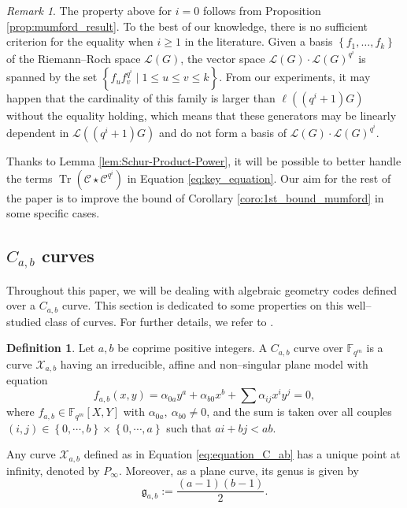 \documentclass[a4paper]{amsart}
\theoremstyle{definition}
\newtheorem{definition}[thm]{Definition}
\theoremstyle{remark}
\newtheorem{remark}[thm]{Remark}
\DeclareMathOperator{\trace}{Tr}
\newcommand{\calL}{\mathcal{L}}
\newcommand{\calC}{\mathcal{C}}
\newcommand{\calX}{\mathcal{X}}
\newcommand{\fqm}{\mathbb{F}_{q^m}}
\newcommand{\Tr}[1]{\trace\!\left(#1\right)}
\newcommand{\set}[1]{\left\{#1\right\}}
\begin{document}
\begin{remark}
The property above for $i=0$ follows from Proposition \ref{prop:mumford_result}. To the best of our knowledge, there is no sufficient criterion for the equality when $i \geq 1$ in the literature. Given a basis $\set{f_1,\dots,f_k}$ of the Riemann--Roch space $\calL(G)$, the vector space $\calL(G)\cdot \calL(G)^{q^i}$ is spanned by the set $\set{f_u f_v^{q^i} \mid 1 \leq u \leq v \leq k}$. From our experiments, it may happen that the cardinality of this family is larger than $\ell((q^i+1)G)$ without the equality holding, which means that these generators may be linearly dependent in $\calL((q^i+1)G)$ and do not form a basis of $\calL(G)\cdot \calL(G)^{q^i}$.
\end{remark}

Thanks to Lemma \ref{lem:Schur-Product-Power}, it will be possible to better handle the terms $\Tr{\calC\star \calC^{q^i}}$ in Equation \eqref{eq:key_equation}. Our aim for the rest of the paper is to improve the bound of Corollary \ref {coro:1st_bound_mumford} in some specific cases.

\subsection{$C_{a,b}$ curves} \label{section:C_a,b_codes}
Throughout this paper, we will be dealing with algebraic geometry codes defined over a $C_{a,b}$ curve. This section is dedicated to some properties on this well--studied class of curves. For further details, we refer to \cite{Miu93}. 

\begin{definition} \label{def:C_ab_curves} 
Let $a,b$ be coprime positive integers. A $C_{a,b}$ curve over $\fqm$ is a curve $\calX_{a,b}$ having an irreducible, affine and non--singular plane model with equation
\begin{equation} \label{eq:equation_C_ab}
f_{a,b}(x,y) = \alpha_{0a}y^a + \alpha_{b0}x^b + \sum \alpha_{ij}x^iy^j = 0,
\end{equation}
where $f_{a,b} \in \fqm[X,Y]$ with $\alpha_{0a}, \: \alpha_{b0} \neq 0$, and the sum is taken over all couples $(i,j) \in \set{0,\cdots,b} \times \set{0,\cdots,a}$ such that $ai+bj < ab$.
\end{definition}
Any curve $\calX_{a,b}$ defined as in Equation \eqref{eq:equation_C_ab} has a unique point at infinity, denoted by $P_{\infty}$. Moreover, as a plane curve, its genus is given by
\[\mathfrak{g}_{a,b}:=\dfrac{(a-1)(b-1)}{2}.\]
\end{document}
